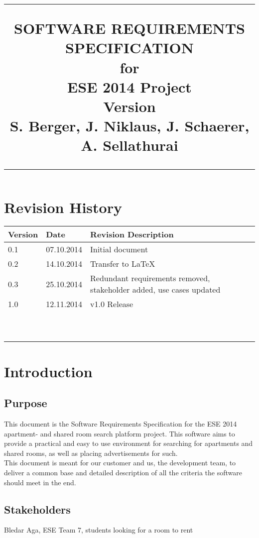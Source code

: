 \documentclass{scrreprt}
\title{%
\flushright
\rule{16cm}{5pt}\vskip1cm
\Huge{SOFTWARE REQUIREMENTS\\ SPECIFICATION}\\
\vspace{2cm}
for\\
\vspace{2cm}
ESE 2014 Project\\
\vspace{2cm}
\LARGE{Version \myversion \\}
\vspace{2cm}
S. Berger, J. Niklaus, J. Schaerer, A. Sellathurai \\
\vfill
\rule{16cm}{5pt}
}
\date{}
\begin{document}
\maketitle
\tableofcontents
\chapter*{Revision History}

\begin{tabular}{|l|l| p{10cm}|}
\hline 
\textbf{Version} & \textbf{Date} & \textbf{Revision Description} \\ 
\hline 
0.1 & 07.10.2014 & Initial document \\ 
\hline 
0.2 & 14.10.2014 & Transfer to LaTeX  \\ 
\hline 
0.3 & 25.10.2014 &  Redundant requirements removed, stakeholder added, use cases updated\\ 
\hline 
1.0 & 12.11.2014 & v1.0 Release\\ 
\hline 
&  &  \\ 
\hline 
&   & \\ 
\hline 
&  &  \\ 
\hline 
&   & \\ 
\hline 
&  &  \\ 
\hline 
&   & \\ 
\hline 
&  &  \\ 
\hline 
&   & \\ 
\hline 
&  &  \\ 
\hline 
&   & \\ 
\hline 
\end{tabular} 


\chapter{Introduction}
\section{Purpose}
This document is the Software Requirements Specification for the ESE 2014 apartment- and shared room search platform project. This software aims to provide a practical and easy to use environment for searching for apartments and shared rooms, as well as placing advertisements for such. \\
This document is meant for our customer and us, the development team, to deliver a common base and detailed description of all the criteria the software should meet in the end. 
\section{Stakeholders}
Bledar Aga, ESE Team 7, students looking for a room to rent
\end{document}
